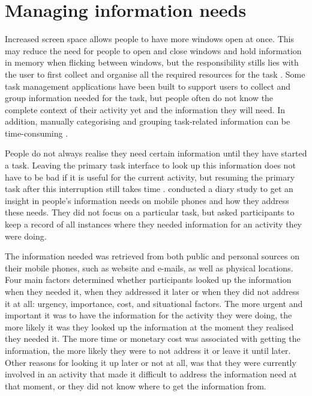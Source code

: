\section{Managing information needs}
Increased screen space allows people to have more windows open at once. This may reduce the need for people to open and close windows and hold information in memory when flicking between windows, but the responsibility stills lies with the user to first collect and organise all the required resources for the task \citep{Bardram2006}. Some task management applications have been built to support users to collect and group information needed for the task, but people often do not know the complete context of their activity yet and the information they will need. In addition, manually categorising and grouping task-related information can be time-consuming \citep{Cangiano2009}.

People do not always realise they need certain information until they have started a task. Leaving the primary task interface to look up this information does not have to be bad if it is useful for the current activity, but resuming the primary task after this interruption still takes time \citep{Rule2013}.
\citet{Sohn2008} conducted a diary study to get an insight in people's information needs on mobile phones and how they address these needs. They did not focus on a particular task, but asked participants to keep a record of all instances where they needed information for an activity they were doing.

The information needed was retrieved from both public and personal sources on their mobile phones, such as website and e-mails, as well as physical locations. Four main factors determined whether participants looked up the information when they needed it, when they addressed it later or when they did not address it at all: urgency, importance, cost, and situational factors. The more urgent and important it was to have the information for the activity they were doing, the more likely it was they looked up the information at the moment they realised they needed it. The more time or monetary cost was associated with getting the information, the more likely they were to not address it or leave it until later. Other reasons for looking it up later or not at all, was that they were currently involved in an activity that made it difficult to address the information need at that moment, or they did not know where to get the information from.


